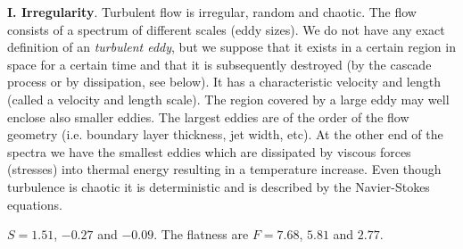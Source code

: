 {\bf I. Irregularity}. Turbulent flow is irregular, random and chaotic.  The flow consists
of a spectrum of different scales (eddy sizes).
We do not have any exact definition of an \emph{turbulent eddy}, but
we suppose that it exists in a certain region in space for a certain time and that it is subsequently
destroyed (by the cascade process or by dissipation, see below).
It has a characteristic velocity and length (called a velocity and length scale). The region
covered by a large eddy may well enclose also smaller eddies.
The largest eddies are of the order of the flow geometry (i.e. boundary layer thickness,
jet width, etc).
At the other end of the spectra we have the smallest eddies
which are dissipated by viscous forces (stresses) into thermal energy resulting in a temperature increase. Even though
turbulence is chaotic it is deterministic and is described by the Navier-Stokes equations.

 $S=1.51$, $-0.27$ and $-0.09$. The flatness
are $F= 7.68$, $5.81$ and $2.77$.


